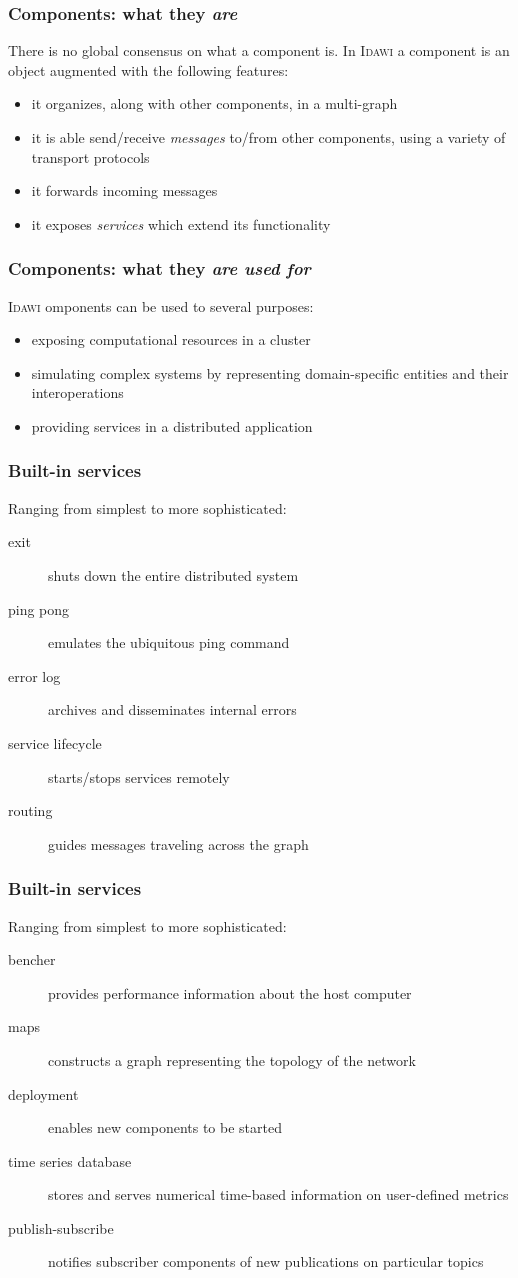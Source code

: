 \documentclass[11pt]{beamer}
\newcommand{\idawi}[1]{\textsc{Idawi}\xspace}
\begin{document}
\begin{frame}
\frametitle{Components: what they \emph{are}}
There is no global consensus on what a component is. In \idawi, a component is an object augmented with the following features:
\begin{itemize}
	\item it organizes, along with other components, in a multi-graph
	\item it is able send/receive \emph{messages} to/from other components, using a variety of transport protocols
	\item it forwards incoming messages
	\item it exposes \emph{services} which extend its  functionality
\end{itemize}
\end{frame}


\begin{frame}
\frametitle{Components: what they \emph{are used for}}
\idawi components can be used to several purposes:
\begin{itemize}
	\item exposing computational resources in a cluster
	\item simulating complex systems by representing domain-specific entities and their interoperations
	\item providing services in a distributed application
\end{itemize}
\end{frame}


\begin{frame}
\frametitle{Built-in services}
Ranging from simplest to more sophisticated:
\begin{description}
	\item[exit] shuts down the entire distributed system
	\item[ping pong] emulates the ubiquitous ping command
	\item[error log] archives and disseminates internal errors
	\item[service lifecycle] starts/stops services remotely
	\item[routing] guides messages traveling across the  graph
\end{description}
\end{frame}


\begin{frame}
\frametitle{Built-in services}
Ranging from simplest to more sophisticated:
\begin{description}
	\item[bencher] provides performance information about the host computer
	\item[maps]  constructs a graph representing the topology of the network
	\item[deployment] enables new components to be started 
	\item[time series database] stores and serves numerical time-based information on user-defined metrics
	\item[publish-subscribe] notifies subscriber components of new publications on particular topics
\end{description}
\end{frame}
\end{document}
